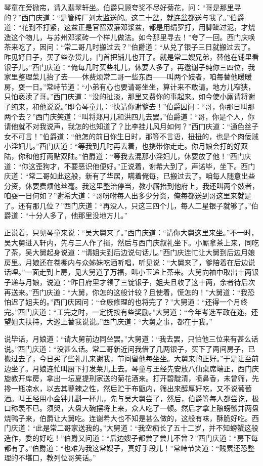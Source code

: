 琴童在旁掀帘，请入翡翠轩坐。伯爵只顾夸奖不尽好菊花，问：“哥是那里寻的？”西门庆道：“是管砖厂刘太监送的。这二十盆，就连盆都送与我了。”伯爵道：“花到不打紧，这盆正是官窑双箍邓浆盆，都是用绢罗打，用脚跐过泥，才烧造这个物儿，与苏州邓浆砖一个样儿做法。如今那里寻去！”夸了一回。西门庆唤茶来吃了，因问：“常二哥几时搬过去？”伯爵道：“从兑了银子三日就搬过去了。昨见好日子，买了些杂货儿，门首把铺儿也开了。就是常二嫂兄弟，替他在铺里看银子儿。”西门庆道：“俺每几时买些礼儿，休要人多了，再邀谢子纯你三四位，我家里整理菜儿抬了去——休费烦常二哥一些东西——叫两个妓者，咱每替他暖暖房，耍一日。”常峙节道：“小弟有心也要请哥坐坐，算计来不敢请。地方儿窄狭，只怕亵渎了哥。”西门庆道：“没的扯淡，那里又费你的事起来。如今使小厮请将谢子纯来，和他说说。”即令琴童儿：“快请你谢爹去！”伯爵因问：“哥，你那日叫那两个去？”西门庆笑道：“叫将郑月儿和洪四儿去罢。”伯爵道：“哥，你是个人，你请他就不对我说声，我怎的也知道了？比李挂儿风月如何？”西门庆道：“通色丝子女不可言！”伯爵道：“他怎的前日你生日时，那等不言语，扭扭的，也是个肉佞贼小淫妇儿。”西门庆道：“等我到几时再去着，也携带你走走。你月娘会打的好双陆，你和他打两贴双陆。”伯爵道：“等我去混那小淫妇儿，休要放了他！”西门庆道：“你这歪狗才，不要恶识他便好。”正说着，谢希大到了，声诺毕，坐下。西门庆道：“常二哥如此这般，新有了华居，瞒着俺每，已搬过去了。咱每人随意出些分资，休要费烦他丝毫。我这里整治停当，教小厮抬到他府上，我还叫两个妓者，咱耍一日何如？”谢希大道：“哥吩咐每人出多少分资，俺每都送到哥这里来就是了。还有那几位？”西门庆道：“再没人，只这三四个儿，每人二星银子就够了。”伯爵道：“十分人多了，他那里没地方儿。”

正说着，只见琴童来说：“吴大舅来了。”西门庆道：“请你大舅这里来坐。”不一时，吴大舅进入轩内，先与三人作了揖，然后与西门庆叙礼坐下。小厮拿茶上来，同吃了茶，吴大舅起身说道：“请姐夫到后边说句话儿。”西门庆连忙让大舅到后边月娘房里。月娘还在卷棚内与众姊妹吃酒听唱，听见说：“大舅来了，爹陪着在后边说话哩。”一面走到上房，见大舅道了万福，叫小玉递上茶来。大舅向袖中取出十两银子递与月娘，说道：“昨日府里才领了三锭银子，姐夫且收了这十两，余者待后次再送来。”西门庆道：“大舅，你怎的这般计较？且使着，慌怎的！”大舅道：“我恐怕迟了姐夫的。”西门庆因问：“仓廒修理的也将完了？”大舅道：“还得一个月终完。”西门庆道：“工完之时，一定抚按有些奖励。”大舅道：“今年考选军政在迩，还望姐夫扶持，大巡上替我说说。”西门庆道：“大舅之事，都在于我。”

说毕话，月娘道：“请大舅前边同坐罢。”大舅道：“我去罢，只怕他三位来有甚么话说。”西门庆道：“没甚么话。常二哥新近问我借了几两银子，买下了两间房子，已搬过去了，今日买了些礼儿来谢我，节间留他每坐坐。大舅来的正好。”于是让至前边坐了。月娘连忙叫厨下打发莱儿上去。琴童与王经先安放八仙桌席端正，西门庆旋教开库房，拿出一坛夏提刑家送的菊花酒来。打开碧靛清，喷鼻香，未曾筛，先搀一瓶凉水，以去其蓼辣之性，然后贮于布甑内，筛出来醇厚好吃，又不说葡萄酒。叫王经用小金钟儿斟一杯儿，先与吴大舅尝了，然后，伯爵等每人都尝讫，极口称羡不已。须臾，大盘大碗摆将上来，众人吃了一顿。然后才拿上酿螃蟹并两盘烧鸭子来，伯爵让大舅吃。连谢希大也不知是甚么做的，这般有味，酥脆好吃。西门庆道：“此是常二哥家送我的。”大舅道：“我空痴长了五十二岁，并不知螃蟹这般造作，委的好吃！”伯爵又问道：“后边嫂子都尝了尝儿不曾？”西门庆道：“房下每都有了。”伯爵道：“也难为我这常嫂子，真好手段儿！”常峙节笑道：“贱累还恐整理的不堪口，教列位哥笑话。”

